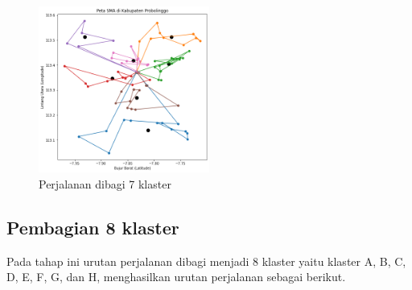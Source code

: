 \begin{figure}[H]
\centering
\includegraphics[width=0.5\textwidth]{Gambar/hasil_mtsp/7}
\caption{Perjalanan dibagi 7 klaster}
\label{fig:hasil_mtsp7}
\end{figure}

\subsection{Pembagian 8 klaster}

Pada tahap ini urutan perjalanan dibagi menjadi 8 klaster yaitu klaster A, B, C, D, E, F, G, dan H, menghasilkan urutan perjalanan sebagai berikut.


